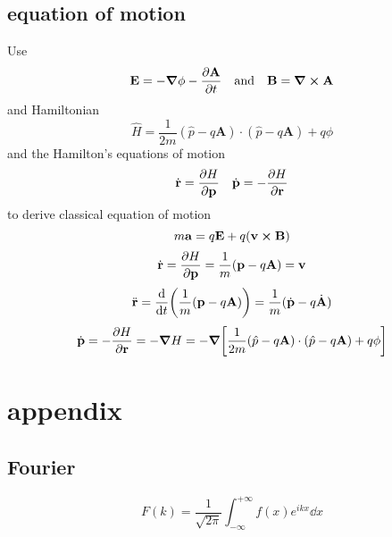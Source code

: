 \documentclass[12pt]{article}
\begin{document}
\subsection*{equation of motion}
Use \[\vb{E}=-\grad{\phi}-\pdv{\vb{A}}{t}\qq{and}\vb{B}=\curl{\vb{A}}\]
and Hamiltonian \[\hat{H}=\frac{1}{2m}(\hat{p}-q\mathbf{A})\cdot(\hat{p}-q\mathbf{A})+ q\phi\]
and the Hamilton's equations of motion \[\dot{\vb{r}}=\pdv{H}{\vb{p}}\quad\dot{\vb{p}}=-\pdv{H}{\vb{r}}\]
to derive classical equation of motion \[m\vb{a}=q\vb{E}+q(\vb{v}\cp\vb{B})\]
\[\dot{\vb{r}}=\pdv{H}{\vb{p}}=\frac{1}{m}(\vb{p}-q\vb{A})=\vb{v}\]
\[\ddot{\vb{r}}=\dv{t}\qty(\frac{1}{m}(\vb{p}-q\vb{A}))=\frac{1}{m}(\dot{\vb{p}}-q\dot{\vb{A}})\]
\[\dot{\vb{p}}=-\pdv{H}{\vb{r}}=-\grad{H}=-\grad{\qty[\frac{1}{2m}(\hat{p}-q\mathbf{A})\cdot(\hat{p}-q\mathbf{A})+ q\phi]}\]
\section*{appendix}
\subsection*{Fourier}
\[F(k)=\frac{1}{\sqrt{2\pi}}\int_{-\infty}^{+\infty}f(x)e^{ikx}\dd{x}\]
\end{document}
